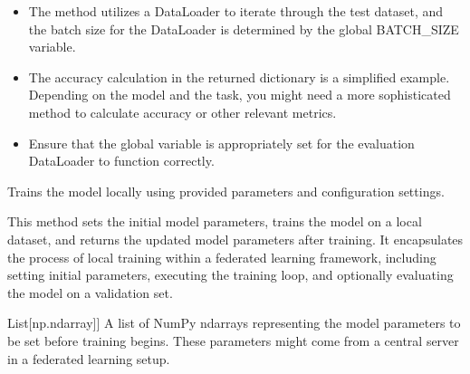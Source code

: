 \documentclass[letterpaper,10pt,english]{sphinxmanual}
\begin{document}
\begin{fulllineitems}
\begin{fulllineitems}
\begin{description}
\begin{itemize}
\item {} 
\sphinxAtStartPar
The method utilizes a DataLoader to iterate through the test dataset, and the batch size for the DataLoader is determined by the global BATCH\_SIZE variable.

\item {} 
\sphinxAtStartPar
The accuracy calculation in the returned dictionary is a simplified example. Depending on the model and the task, you might need a more sophisticated method to calculate accuracy or other relevant metrics.

\item {} 
\sphinxAtStartPar
Ensure that the global  variable is appropriately set for the evaluation DataLoader to function correctly.

\end{itemize}

\end{description}

\end{fulllineitems}


\begin{fulllineitems}
\label{\detokenize{insur_FL_client:insur_FL_client.ClaimsFrequencyFLClient.fit}}
\pysigstartsignatures
{}
\pysigstopsignatures
\sphinxAtStartPar
Trains the model locally using provided parameters and configuration settings.

\sphinxAtStartPar
This method sets the initial model parameters, trains the model on a local dataset,
and returns the updated model parameters after training. It encapsulates the process of
local training within a federated learning framework, including setting initial parameters,
executing the training loop, and optionally evaluating the model on a validation set.
\begin{description}
\begin{description}
\sphinxlineitem{parameters}{[}List{[}np.ndarray{]}{]}
\sphinxAtStartPar
A list of NumPy ndarrays representing the model parameters to be set before training begins.
These parameters might come from a central server in a federated learning setup.


\end{description}
\end{description}
\end{fulllineitems}
\end{fulllineitems}
\end{document}
